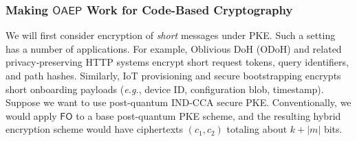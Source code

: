 {%


\fi


\iffalse
\subsubsection{Making $\mathsf{OAEP}$ Work for Code-Based Cryptography}


\iffalse
{}
We will first consider encryption of \emph{short} messages under PKE. Such a setting has a number of applications. For example, Oblivious DoH (ODoH) and related privacy‑preserving HTTP systems encrypt short request tokens, query identifiers, and path hashes. Similarly, IoT provisioning and secure bootstrapping encrypts short onboarding payloads (\emph{e.g.},  device ID, configuration blob, timestamp). Suppose we want to use post-quantum IND-CCA secure PKE. Conventionally,  we would apply $\mathsf{FO}$ to a base post-quantum PKE scheme, and  the resulting hybrid encryption scheme would have ciphertexts $(c_1,c_2)$ totaling about $k + |m|$ bits.

}
